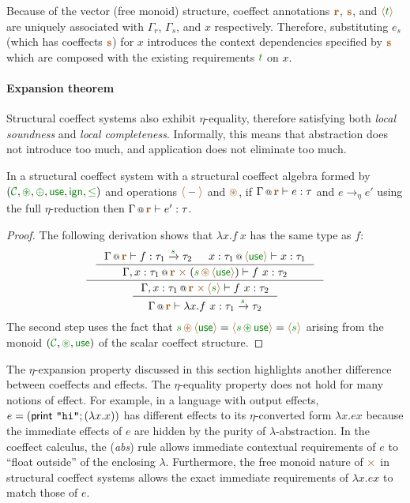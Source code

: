 \noindent
Because of the vector (free monoid) structure, coeffect annotations $\aclrd{\textbf{r}}$, 
$\aclrd{\textbf{s}}$, and $\alift{\cclrd{t}}$ are uniquely associated with $\Gamma_r$, 
$\Gamma_s$, and $x$ respectively. Therefore, substituting $e_s$ (which has coeffects 
$\aclrd{\textbf{s}}$) for $x$ introduces the context dependencies specified by $\aclrd{\textbf{s}}$
which are composed with the existing requirements $\cclrd{t}$ on $x$. 

\paragraph{Expansion theorem}
Structural coeffect systems also exhibit $\eta$-equality, therefore satisfying both
\emph{local soundness} and \emph{local completeness}. Informally, this means that 
abstraction does not introduce too much, and application does not eliminate too much.

\begin{theorem}
In a structural coeffect system with a structural coeffect algebra formed by 
$(\C, \cseq, \cpar, \cunit, \czero, \cleq)$ and operations $\alift{-}$ and $\aseq$,
if $\coctx{\Gamma}{\aclrd{\textbf{r}}} \vdash e : \tau$ 
and $e \rightarrow_{\eta} e'$ using the full $\eta$-reduction then
$\coctx{\Gamma}{\aclrd{\textbf{r}}} \vdash e' : \tau$.
\end{theorem}
\begin{proof}
The following derivation shows that $\lambda x.f~x$ has the same type as $f$:
\begin{equation*}
\inference
  { \inference
    { \coctx{\Gamma}{\aclrd{\textbf{r}}} \vdash f : \tau_1 \xrightarrow{\cclrd{s}} \tau_2 &
      \coctx{x:\tau_1}{\alift{\cunit}} \vdash x:\tau_1 }
    { \coctx{\Gamma, x:\tau_1}{\aclrd{\textbf{r}} \;\atimes\;(\cclrd{s}\,\aseq\,\alift{\cunit}) } \vdash f~x : \tau_2 } }
  { \inference
    { \coctx{\Gamma, x:\tau_1}{\aclrd{\textbf{r}} \;\atimes\,\alift{\cclrd{s}} } \vdash f~x : \tau_2 }
    { \coctx{\Gamma}{ \aclrd{\textbf{r}} } \vdash \lambda x.f~x : \tau_1 \xrightarrow{\cclrd{s}} \tau_2 } }
\end{equation*}
%
The second step uses the fact that 
$\cclrd{s} \,\aseq\, \alift{\cunit} = \alift{\cclrd{s} \,\cseq\, \cunit} = \alift{\cclrd{s}}$ 
arising from the monoid $(\C, \cseq, \cunit)$ of the scalar coeffect structure.
\end{proof}

\noindent
The $\eta$-expansion property discussed in this section highlights another difference 
between coeffects and effects. The $\eta$-equality property does not hold for many notions 
of effect. For example, in a language with output effects, $e = (\textsf{print \texttt{"hi"}}; (\lambda x . x))$ 
has different effects to its $\eta$-converted form $\lambda x . e x$ because the immediate 
effects of $e$ are hidden by the purity of $\lambda$-abstraction. In the coeffect calculus, 
the (\emph{abs}) rule allows immediate contextual requirements of $e$ to ``float outside'' 
of the enclosing $\lambda$. Furthermore, the free monoid nature of $\atimes$ in structural 
coeffect systems allows the exact immediate requirements of $\lambda x . e x$ to match 
those of $e$. 

